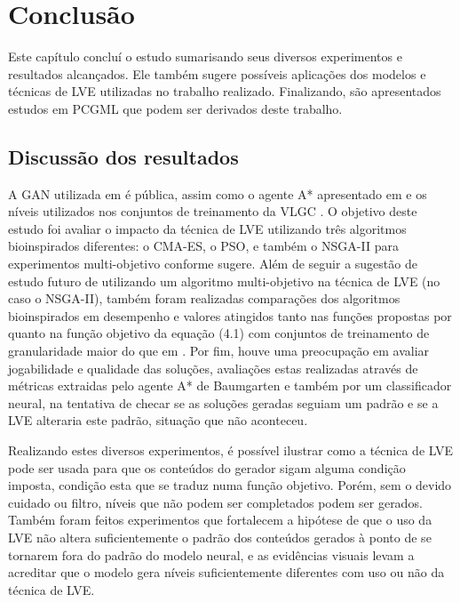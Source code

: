 \chapter{Conclusão}

Este capítulo concluí o estudo sumarisando seus diversos experimentos e resultados alcançados. Ele também sugere possíveis aplicações dos modelos e técnicas de LVE utilizadas no trabalho realizado. Finalizando, são apresentados estudos em PCGML que podem ser derivados deste trabalho. 

\section{Discussão dos resultados}

A GAN utilizada em \citep{marioGAN} é pública, assim como o agente A* apresentado em \cite{marioAI} e os níveis utilizados nos conjuntos de treinamento da VLGC \cite{VGLC}. O objetivo deste estudo foi avaliar o impacto da técnica de LVE utilizando três algoritmos bioinspirados diferentes: o CMA-ES, o PSO, e também o NSGA-II para experimentos multi-objetivo conforme \citet{marioGAN} sugere. Além de seguir a sugestão de estudo futuro de \citet{marioGAN} utilizando um algoritmo multi-objetivo na técnica de LVE (no caso o NSGA-II), também foram realizadas comparações dos algoritmos bioinspirados em desempenho e valores atingidos tanto nas funções propostas por \citet{marioGAN} quanto na função objetivo da equação (4.1) com conjuntos de treinamento de granularidade maior do que em \cite{marioGAN}. Por fim, houve uma preocupação em avaliar jogabilidade e qualidade das soluções, avaliações estas realizadas através de métricas extraidas pelo agente A* de Baumgarten e também por um classificador neural, na tentativa de checar se as soluções geradas seguiam um padrão e se a LVE alteraria este padrão, situação que não aconteceu.

Realizando estes diversos experimentos, é possível ilustrar como a técnica de LVE pode ser usada para que os conteúdos do gerador sigam alguma condição imposta, condição esta que se traduz numa função objetivo. Porém, sem o devido cuidado ou filtro, níveis que não podem ser completados podem ser gerados. Também foram feitos experimentos que fortalecem a hipótese de que o uso da LVE não altera suficientemente o padrão dos conteúdos gerados à ponto de se tornarem fora do padrão do modelo neural, e as evidências visuais levam a acreditar que o modelo gera níveis suficientemente diferentes com uso ou não da técnica de LVE.

